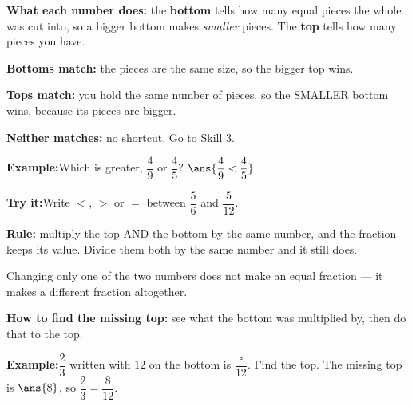 \documentclass[12pt]{article}
\begin{document}


\begin{formulabox}
\textbf{What each number does:} the \textbf{bottom} tells how many equal pieces
the whole was cut into, so a bigger bottom makes \emph{smaller} pieces. The
\textbf{top} tells how many pieces you have.\par
\smallskip
\textbf{Bottoms match:} the pieces are the same size, so the bigger top wins.\par
\textbf{Tops match:} you hold the same number of pieces, so the SMALLER bottom
wins, because its pieces are bigger.\par
\smallskip
\textbf{Neither matches:} no shortcut. Go to Skill 3.
\end{formulabox}

\begin{examplebox}
\textbf{Example:}\quad Which is greater, $\dfrac{4}{9}$ or $\dfrac{4}{5}$?
$\ans{\dfrac{4}{9} < \dfrac{4}{5}}$
\end{examplebox}

\begin{tryitbox}
\textbf{Try it:}\quad Write $<$, $>$ or $=$ between $\dfrac{5}{6}$ and
$\dfrac{5}{12}$.\\[2pt]
\end{tryitbox}


\begin{formulabox}
\textbf{Rule:} multiply the top AND the bottom by the same number, and the
fraction keeps its value. Divide them both by the same number and it still
does.\par
\smallskip
Changing only one of the two numbers does not make an equal fraction --- it
makes a different fraction altogether.\par
\smallskip
\textbf{How to find the missing top:} see what the bottom was multiplied by,
then do that to the top.
\end{formulabox}

\begin{examplebox}
\textbf{Example:}\quad $\dfrac{2}{3}$ written with $12$ on the bottom is
$\dfrac{\square}{12}$. Find the top.
The missing top is $\ans{8}$, so $\dfrac{2}{3} = \dfrac{8}{12}$.
\end{examplebox}
\end{document}
